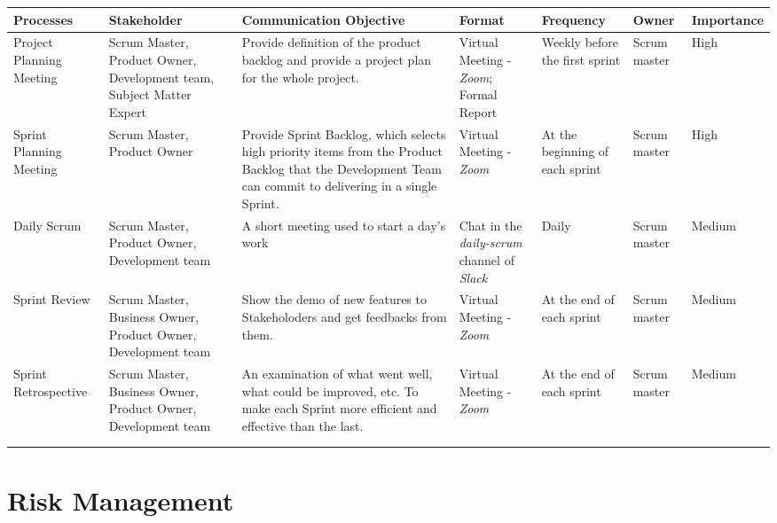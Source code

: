 \documentclass{report}
\begin{document}
\begin{tabularx}{\linewidth}{%
  >{\raggedright\arraybackslash}p{1.5cm}%
  >{\raggedright\arraybackslash}X%
  >{\raggedright\arraybackslash}X%
  >{\raggedright\arraybackslash}p{1.1cm}%
  >{\raggedright\arraybackslash}p{1.5cm}%
  >{\raggedright\arraybackslash}p{1.1cm}%
  >{\raggedright\arraybackslash}l}
  \toprule
  Processes & Stakeholder & Communication Objective & Format & Frequency & Owner & Importance
  \\
  \midrule
  Project Planning Meeting
  & Scrum Master, Product Owner, Development team, Subject Matter Expert
  & Provide definition of the product backlog and provide a project plan for the whole project.
  & Virtual Meeting - \textit{Zoom}; Formal Report
  & Weekly before the first sprint
  & Scrum master
  & High
  \\
  \midrule
  Sprint Planning Meeting
  & Scrum Master, Product Owner
  & Provide Sprint Backlog, which selects high priority items from the Product Backlog that the Development Team can commit to delivering in a single Sprint.
  & Virtual Meeting - \textit{Zoom}
  & At the beginning of each sprint
  & Scrum master
  & High
  \\
  \midrule
  Daily Scrum
  & Scrum Master, Product Owner, Development team
  & A short meeting used to start a day's work
  & Chat in the \textit{daily-scrum} channel of \textit{Slack}
  & Daily
  & Scrum master
  & Medium
  \\
  \midrule
  Sprint Review
  & Scrum Master, Business Owner, Product Owner, Development team
  & Show the demo of new features to Stakeholoders and get feedbacks from them.
  & Virtual Meeting - \textit{Zoom}
  & At the end of each sprint
  & Scrum master
  & Medium
  \\
  \midrule
  Sprint Retrospective
  & Scrum Master, Business Owner, Product Owner, Development team
  & An examination of what went well, what could be improved, etc. To make each Sprint more efficient and effective than the last.
  & Virtual Meeting - \textit{Zoom}
  & At the end of each sprint
  & Scrum master
  & Medium
  \\
  \bottomrule
  \\
  \caption{Communication Matrix}  
  \label{tab:communicationMatrix}
\end{tabularx}

\section{Risk Management}
\label{sec:riskManagement}
\end{document}

